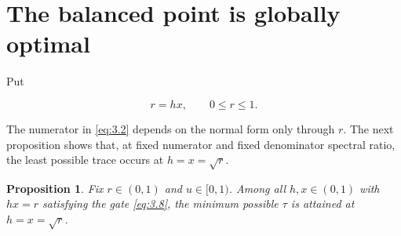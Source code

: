 \documentclass[11pt]{article}
\newtheorem{proposition}[theorem]{Proposition}
\begin{document}
\section{The balanced point is globally optimal}


Put

\[
r=hx,
\qquad 0\le r\le1.
\tag{4.1}\label{eq:4.1}
\]

The numerator in \eqref{eq:3.2} depends on the normal form only through $r$. The next
proposition shows that, at fixed numerator and fixed denominator spectral ratio,
the least possible trace occurs at $h=x=\sqrt r$.

\begin{proposition}
\label{prop:balanced-optimal}
Fix $r\in(0,1)$ and $u\in[0,1)$. Among all
$h,x\in(0,1)$ with $hx=r$ satisfying the gate \eqref{eq:3.8}, the minimum possible
$\tau$ is attained at $h=x=\sqrt r$.

\end{proposition}
\end{document}
